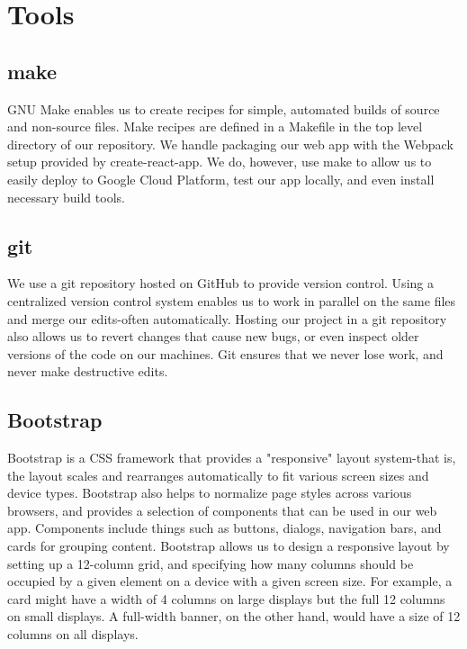 \documentclass{scrartcl}
\begin{document}
    \section{Tools}\label{sec:tools}

    \subsection{make}\label{subsec:make}
    GNU Make enables us to create recipes for simple, automated builds of source and non-source files.
    Make recipes are defined in a Makefile in the top level directory of our repository.
    We handle packaging our web app with the Webpack setup provided by create-react-app.
    We do, however, use make to allow us to easily deploy to Google Cloud Platform, test our app locally, and even install necessary build tools.

    \subsection{git}\label{subsec:git}
    We use a git repository hosted on GitHub to provide version control.
    Using a centralized version control system enables us to work in parallel on the same files and merge our edits-often automatically.
    Hosting our project in a git repository also allows us to revert changes that cause new bugs, or even inspect older versions of the code on our machines.
    Git ensures that we never lose work, and never make destructive edits.

    \subsection{Bootstrap}\label{subsec:bootstrap}
    Bootstrap is a CSS framework that provides a "responsive" layout system-that is, the layout scales and rearranges automatically to fit various screen sizes and device types.
    Bootstrap also helps to normalize page styles across various browsers, and provides a selection of components that can be used in our web app.
    Components include things such as buttons, dialogs, navigation bars, and cards for grouping content.
    Bootstrap allows us to design a responsive layout by setting up a 12-column grid, and specifying how many columns should be occupied by a given element on a device with a given screen size.
    For example, a card might have a width of 4 columns on large displays but the full 12 columns on small displays.
    A full-width banner, on the other hand, would have a size of 12 columns on all displays.
\end{document}
